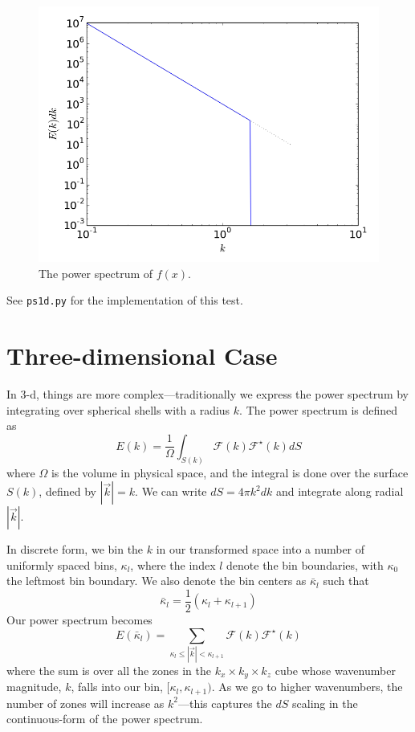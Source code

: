 \documentclass[11pt]{article}
\begin{document}
\begin{figure}[t]
\centering
\includegraphics[width=0.5\linewidth]{ps1d}
\begin{minipage}[b]{0.45\linewidth}
\caption{\label{fig:ps1d} The power spectrum of $f(x)$.}
\end{minipage}
\end{figure}



See {\tt ps1d.py} for the implementation of this test.



\section*{Three-dimensional Case}

In 3-d, things are more complex---traditionally we express the power
spectrum by integrating over spherical shells with a radius $k$.  The
power spectrum is defined as
\begin{equation}
E(k) = \frac{1}{\Omega} \int_{S(k)} \mathcal{F}(k) \mathcal{F}^\star(k) dS
\end{equation}
where $\Omega$ is the volume in physical space, and the integral is done
over the surface $S(k)$, defined by $|\vec{k}| = k$.  We can
write $dS = 4\pi k^2 dk$ and integrate along radial $|\vec{k}|$.

In discrete form, we bin the $k$ in our transformed space into a
number of uniformly spaced bins, $\kappa_l$, where the index
$l$ denote the bin boundaries, with $\kappa_0$ the leftmost bin boundary.
We also denote the bin centers as $\bar{\kappa}_l$ such that
\begin{equation}
\bar{\kappa}_l = \frac{1}{2} ( \kappa_l + \kappa_{l+1} )
\end{equation}
Our power spectrum becomes
\begin{equation}
E(\bar{\kappa}_l) = \sum_{\kappa_{l} \le |\vec{k}| < \kappa_{l+1}}
   \mathcal{F}(k) \mathcal{F}^\star(k)
\end{equation}
where the sum is over all the zones in the $k_x \times k_y \times k_z$
cube whose wavenumber magnitude, $k$, falls into our bin,
$[\kappa_l,\kappa_{l+1})$.  As we go to higher wavenumbers, the number
  of zones will increase as $k^2$---this captures the $dS$ scaling in
  the continuous-form of the power spectrum.
\end{document}
